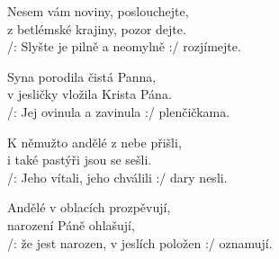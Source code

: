 
\ve{}
Nesem vám noviny, poslouchejte,\\
z betlémské krajiny, pozor dejte.\\
/: Slyšte je pilně a neomylně :/ rozjímejte.

\ve{}
Syna porodila čistá Panna,\\
v jesličky vložila Krista Pána.\\
/: Jej ovinula a zavinula :/ plenčičkama.

\ve{}
K němužto andělé z nebe přišli,\\
i také pastýři jsou se sešli.\\
/: Jeho vítali, jeho chválili :/ dary nesli.

\ve{}
Andělé v oblacích prozpěvují,\\
narození Páně ohlašují,\\
/: že jest narozen, v jeslích položen :/ oznamují.


\esong{}